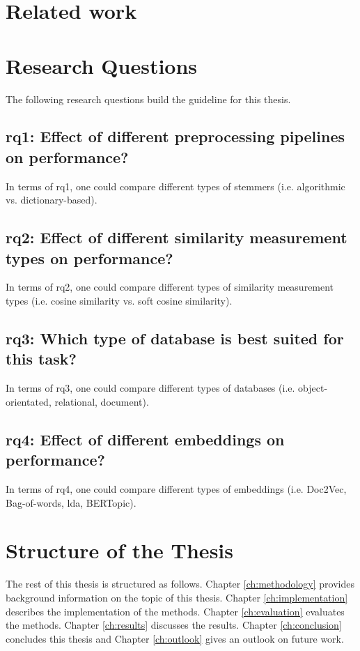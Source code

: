 \section{Related work}\label{sec:related-work}


\section{Research Questions}\label{sec:research-questions}
The following research questions build the guideline for this thesis.

\subsection[\acs{rq}1]{\ac{rq}1: Effect of different preprocessing pipelines on performance?}\label{subsec:rq1}
In terms of \ac{rq}1, one could compare different types of stemmers (i.e. algorithmic vs. dictionary-based).

\subsection[\acs{rq}2]{\ac{rq}2: Effect of different similarity measurement types on performance?}\label{subsec:rq2}
In terms of \ac{rq}2, one could compare different types of similarity measurement types (i.e. cosine similarity vs. soft cosine similarity).

\subsection[\acs{rq}3]{\ac{rq}3: Which type of database is best suited for this task?}\label{subsec:rq3}
In terms of \ac{rq}3, one could compare different types of databases (i.e. object-orientated, relational, document).

\subsection[\acs{rq}4]{\ac{rq}4: Effect of different embeddings on performance?}\label{subsec:rq4}
In terms of \ac{rq}4, one could compare different types of embeddings (i.e. Doc2Vec, Bag-of-words, \ac{lda}, BERTopic).



\section{Structure of the Thesis}\label{sec:structure-of-the-thesis}
The rest of this thesis is structured as follows.
Chapter \ref{ch:methodology} provides background information on the topic of this thesis.
Chapter \ref{ch:implementation} describes the implementation of the methods.
Chapter \ref{ch:evaluation} evaluates the methods.
Chapter \ref{ch:results} discusses the results.
Chapter \ref{ch:conclusion} concludes this thesis and 
Chapter \ref{ch:outlook} gives an outlook on future work.